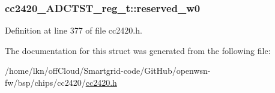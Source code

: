 \subsubsection[{\texorpdfstring{reserved\+\_\+w0}{reserved_w0}}]{ cc2420\+\_\+\+A\+D\+C\+T\+S\+T\+\_\+reg\+\_\+t\+::reserved\+\_\+w0}\hypertarget{structcc2420___a_d_c_t_s_t__reg__t_a4e03ff5412d3ba321492b2aeb52021f7}{}\label{structcc2420___a_d_c_t_s_t__reg__t_a4e03ff5412d3ba321492b2aeb52021f7}


Definition at line 377 of file cc2420.\+h.



The documentation for this struct was generated from the following file\+:\begin{DoxyCompactItemize}
\item 
/home/lkn/off\+Cloud/\+Smartgrid-\/code/\+Git\+Hub/openwsn-\/fw/bsp/chips/cc2420/\hyperlink{cc2420_8h}{cc2420.\+h}\end{DoxyCompactItemize}
